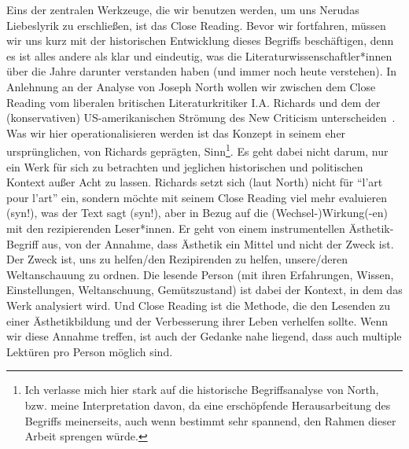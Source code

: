 Eins der zentralen Werkzeuge, die wir benutzen werden, um uns Nerudas Liebeslyrik zu erschließen, ist das Close Reading.
Bevor wir fortfahren, müssen wir uns kurz mit der historischen Entwicklung dieses Begriffs beschäftigen, denn es ist alles andere als klar und eindeutig, was die Literaturwissenschaftler*innen über die Jahre darunter verstanden haben (und immer noch heute verstehen).
In Anlehnung an der Analyse von Joseph North wollen wir zwischen dem Close Reading vom liberalen britischen Literaturkritiker I.A. Richards und dem der (konservativen) US-amerikanischen Strömung des New Criticism unterscheiden~\autocite{North2013}.
Was wir hier operationalisieren werden ist das Konzept in seinem eher ursprünglichen, von Richards geprägten, Sinn\footnote{Ich verlasse mich hier stark auf die historische Begriffsanalyse von North, bzw. meine Interpretation davon, da eine erschöpfende Herausarbeitung des Begriffs meinerseits, auch wenn bestimmt sehr spannend, den Rahmen dieser Arbeit sprengen würde.}.
Es geht dabei nicht darum, nur ein Werk für sich zu betrachten und jeglichen historischen und politischen Kontext außer Acht zu lassen.
Richards setzt sich (laut North) nicht für ``l'art pour l'art'' ein, sondern möchte mit seinem Close Reading viel mehr evaluieren (syn!), was der Text sagt (syn!), aber in Bezug auf die (Wechsel-)Wirkung(-en) mit den rezipierenden Leser*innen.
Er geht von einem instrumentellen Ästhetik-Begriff aus, von der Annahme, dass Ästhetik ein Mittel und nicht der Zweck ist.
Der Zweck ist, uns zu helfen/den Rezipirenden zu helfen, unsere/deren Weltanschauung zu ordnen.
Die lesende Person (mit ihren Erfahrungen, Wissen, Einstellungen, Weltanschuung, Gemütszustand) ist dabei der Kontext, in dem das Werk analysiert wird.
Und Close Reading ist die Methode, die den Lesenden zu einer Ästhetikbildung und der Verbesserung ihrer Leben verhelfen sollte.
Wenn wir diese Annahme treffen, ist auch der Gedanke nahe liegend, dass auch multiple Lektüren pro Person möglich sind.

